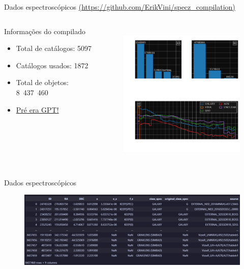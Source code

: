 \begin{frame}{Dados espectroscópicos {\small \textcolor{gray}{\url{(https://github.com/ErikVini/specz_compilation)}}}}
    \begin{columns}[c]
        \hspace{0.5cm}
        \begin{column}{0.40\textwidth}
            \begin{splusbox}{Informações do compilado}
                \begin{itemize}
                    \item Total de catálogos: 5097
                    \item Catálogos usados: 1872
                    \item Total de objetos: \mbox{8 437 460}
                    \item \underline{Pré era GPT!}
                \end{itemize}
            \end{splusbox}
        \end{column}
        \begin{column}{0.50\textwidth}
            \begin{figure}
                \centering
                \includegraphics[height=7cm]{script/images/specz_distributions.pdf}
            \end{figure}
        \end{column}
    \end{columns}
\end{frame}

\begin{frame}[c]{Dados espectroscópicos}
    \begin{figure}
        \centering
        \includegraphics[width=\linewidth]{script/images/specz_compilation.png}
    \end{figure}
\end{frame}

